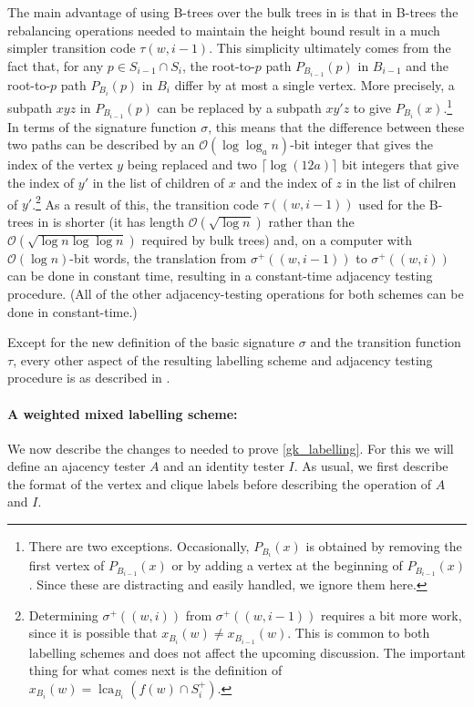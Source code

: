 \documentclass{patmorin}
\DeclareMathOperator{\lca}{lca}
\newcommand{\Oh}{\calO}
\newcommand{\calO}{\mathcal{O}}
\begin{document}
  The main advantage of using B-trees over the bulk trees in \cite{dujmovic.esperet.ea:adjacency} is that in B-trees the rebalancing operations needed to maintain the height bound result in a much simpler transition code $\tau(w,i-1)$.
  This simplicity ultimately comes from the fact that, for any $p\in S_{i-1}\cap S_i$, the root-to-$p$ path $P_{B_{i-1}}(p)$ in $B_{i-1}$ and the root-to-$p$ path $P_{B_i}(p)$ in $B_i$ differ by at most a single vertex.
  More precisely, a subpath $xyz$ in $P_{B_{i-1}}(p)$ can be replaced by a subpath $xy'z$ to give $P_{B_i}(x)$.\footnote{There are two exceptions.
  Occasionally, $P_{B_i}(x)$ is obtained by removing the first vertex of $P_{B_{i-1}}(x)$ or by adding a vertex at the beginning of $P_{B_{i-1}}(x)$.
  Since these are distracting and easily handled, we ignore them here.}  In terms of the signature function $\sigma$, this means that the difference between these two paths can be described by an $\Oh(\log\log_a n)$-bit integer that gives the index of the vertex $y$ being replaced and two $\lceil\log (12a)\rceil$ bit integers that give the index of $y'$ in the list of children of $x$ and the index of $z$ in the list of chilren of $y'$.\footnote{Determining $\sigma^+((w,i))$ from $\sigma^+((w,i-1))$ requires a bit more work, since it is possible that $x_{B_i}(w)\neq x_{B_{i-1}}(w)$.
  This is common to both labelling schemes and does not affect the upcoming discussion.
  The important thing for what comes next is the definition of $x_{B_i}(w)=\lca_{B_i}(f(w)\cap S^+_i)$.}  As a result of this, the transition code $\tau((w,i-1))$ used for the B-trees in \cite{gawrychowski.janczewski:simpler} is shorter (it has length $\Oh(\sqrt{\log n})$ rather than the $\Oh(\sqrt{\log n\log\log n})$ required by bulk trees) and, on a computer with $\Oh(\log n)$-bit words, the translation from $\sigma^+((w,i-1))$ to $\sigma^+((w,i))$ can be done in constant time, resulting in a constant-time adjacency testing procedure.
  (All of the other adjacency-testing operations for both schemes can be done in constant-time.)

  Except for the new definition of the basic signature $\sigma$ and the transition function $\tau$, every other aspect of the resulting labelling scheme and adjacency testing procedure is as described in \cite{dujmovic.esperet.ea:adjacency}.

  \paragraph{A weighted mixed labelling scheme:}
  We now describe the changes to \cite{gawrychowski.janczewski:simpler,dujmovic.esperet.ea:adjacency} needed to prove \cref{gk_labelling}.  For this we will define an ajacency tester $A$ and an identity tester $I$. As usual, we first describe the format of the vertex and clique labels before describing the operation of $A$ and $I$.
\end{document}
